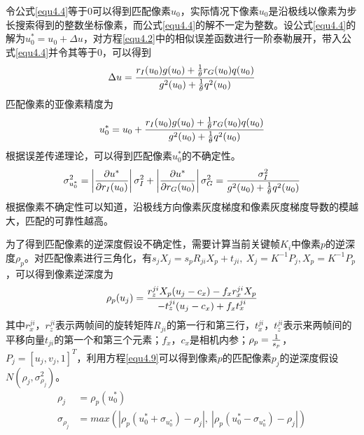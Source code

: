 令公式\eqref{equ4.4}等于$0$可以得到匹配像素$u_0$，实际情况下像素$u_0$是沿极线以像素为步长搜索得到的整数坐标像素，而公式\eqref{equ4.4}的解不一定为整数。设公式\eqref{equ4.4}的解为$u_0^*=u_0+\Delta u$，对方程\eqref{equ4.2}中的相似误差函数进行一阶泰勒展开，带入公式\eqref{equ4.4}并令其等于$0$，可以得到
\begin{equation}
\label{equ4.6}
\Delta u = {{ r_I(u_0) g(u_0)+ {1 \over \theta} r_G(u_0)q(u_0) } \over {g^2(u_0)+ { 1 \over \theta} q^2(u_0)}}
\end{equation}
匹配像素的亚像素精度为
\begin{equation}
\label{equ4.7}
u_0^* = u_0 + {{ r_I(u_0) g(u_0)+ {1 \over \theta} r_G(u_0)q(u_0) } \over {g^2(u_0)+ { 1 \over \theta} q^2(u_0)}}
\end{equation}
根据误差传递理论，可以得到匹配像素$u_0^*$的不确定性。
\begin{equation}
\label{equ4.8}
\sigma_{u_0^*}^2 = \left \vert { \partial u^* \over \partial r_I(u_0) }  \right \vert \sigma_I^2 + \left \vert { \partial u^* \over \partial r_G(u_0) }  \right \vert \sigma_G^2 = { \sigma_I^2 \over g^2(u_0) + {1 \over \theta} q^2(u_0) }
\end{equation}
根据像素不确定性可以知道，沿极线方向像素灰度梯度和像素灰度梯度导数的模越大，匹配的可靠性越高。

为了得到匹配像素的逆深度假设不确定性，需要计算当前关键帧$K_i$中像素$p$的逆深度$\rho_p$。对匹配像素进行三角化，有$s_jX_j = s_pR_{ji}X_p+t_{ji}, \  X_j = K^{-1}P_j, X_p = K^{-1}P_p$，可以得到像素逆深度为
\begin{equation}
\label{equ4.9}
\rho_p(u_j) = { r_z^{ji} X_p (u_j-c_x) - f_x r_x^{ji} X_p  \over - t_z^{ji}(u_j-c_x)+f_x t_x^{ji} }
\end{equation}
其中$r_x^{ji}$，$r_z^{ji}$表示两帧间的旋转矩阵$R_{ji}$的第一行和第三行，$t_x^{ji}$，$t_z^{ji}$表示来两帧间的平移向量$t_{ji}$的第一个和第三个元素；$f_x$，$c_x$是相机内参；$\rho_p = { 1 \over s_p}$，$P_j= \left [ u_j, v_j, 1 \right ] ^T$，利用方程\eqref{equ4.9}可以得到像素$p$的匹配像素$p_j$的逆深度假设$N(\rho_j, \sigma_{\rho_j}^2)$。
\begin{equation}
\label{equ4.10}
\begin{aligned}
 \rho_j &= \rho_p(u_0^*) \\ 
 \sigma_{\rho_j} &= max \left( \left \vert  \rho_p(u_0^*+\sigma_{u_0^*})-\rho_j \right \vert , \  \left \vert  \rho_p(u_0^*-\sigma_{u_0^*})-\rho_j \right \vert \right)
\end{aligned}
\end{equation}

